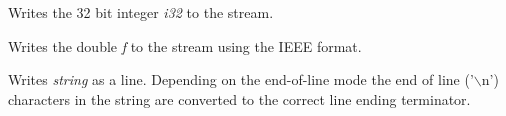 
Writes the 32 bit integer {\it i32} to the stream.

\label{wxtextoutputstreamwritedouble}


Writes the double {\it f} to the stream using the IEEE format.

\label{wxtextoutputstreamwritestring}


Writes {\it string} as a line. Depending on the end-of-line mode the end of
line ('$\backslash$n') characters in the string are converted to the correct
line ending terminator.

